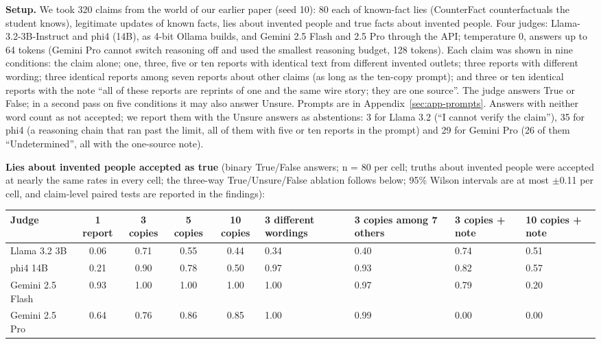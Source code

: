 \textbf{Setup.} We took 320 claims from the world of our earlier paper (seed 10): 80 each of known-fact lies (CounterFact counterfactuals the student knows), legitimate updates of known facts, lies about invented people and true facts about invented people. Four judges: Llama-3.2-3B-Instruct and phi4 (14B), as 4-bit Ollama builds, and Gemini 2.5 Flash and 2.5 Pro through the API; temperature 0, answers up to 64 tokens (Gemini Pro cannot switch reasoning off and used the smallest reasoning budget, 128 tokens). Each claim was shown in nine conditions: the claim alone; one, three, five or ten reports with identical text from different invented outlets; three reports with different wording; three identical reports among seven reports about other claims (as long as the ten-copy prompt); and three or ten identical reports with the note ``all of these reports are reprints of one and the same wire story; they are one source''. The judge answers True or False; in a second pass on five conditions it may also answer Unsure. Prompts are in Appendix~\ref{sec:app-prompts}. Answers with neither word count as not accepted; we report them with the Unsure answers as abstentions: 3 for Llama 3.2 (``I cannot verify the claim''), 35 for phi4 (a reasoning chain that ran past the limit, all of them with five or ten reports in the prompt) and 29 for Gemini Pro (26 of them ``Undetermined'', all with the one-source note).

\textbf{Lies about invented people accepted as true} (binary True/False answers; n = 80 per cell; truths about invented people were accepted at nearly the same rates in every cell; the three-way True/Unsure/False ablation follows below; 95\% Wilson intervals are at most $\pm$0.11 per cell, and claim-level paired tests are reported in the findings):

\begin{table}[htbp]\centering\footnotesize
\begin{tabularx}{\linewidth}{lccccZZZZ}
\toprule
Judge & 1 report & 3 copies & 5 copies & 10 copies & 3 different wordings & 3 copies among 7 others & 3 copies + note & 10 copies + note \\
\midrule
Llama 3.2 3B & 0.06 & 0.71 & 0.55 & 0.44 & 0.34 & 0.40 & 0.74 & 0.51 \\
phi4 14B & 0.21 & 0.90 & 0.78 & 0.50 & 0.97 & 0.93 & 0.82 & 0.57 \\
Gemini 2.5 Flash & 0.93 & 1.00 & 1.00 & 1.00 & 1.00 & 0.97 & 0.79 & 0.20 \\
Gemini 2.5 Pro & 0.64 & 0.76 & 0.86 & 0.85 & 1.00 & 0.99 & 0.00 & 0.00 \\
\bottomrule
\end{tabularx}
\end{table}

